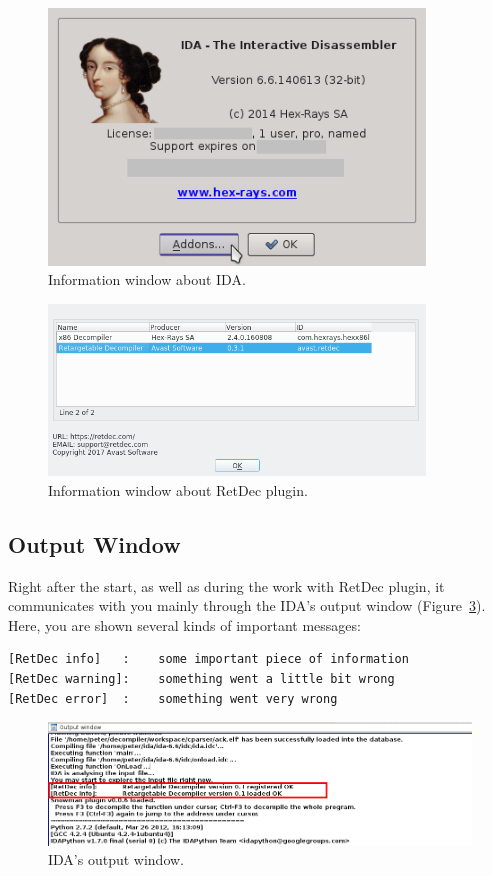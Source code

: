 \documentclass[pdftex, a4paper,12pt, oneside, svgnames]{article}
\begin{document}
\begin{figure}[!ht]
	\centering
	\includegraphics[width=10cm]{figures/addons}
	\caption{Information window about IDA.}
	\label{fig:addons}
\end{figure}

\begin{figure}[!ht]
	\centering
	\includegraphics[width=10cm]{figures/plugin-info}
	\caption{Information window about RetDec plugin.}
	\label{fig:plugin-info}
\end{figure}

\subsection{Output Window}
Right after the start, as well as during the work with RetDec plugin, it communicates with you mainly through the IDA's output window (Figure~\ref{fig:ida-output-window}). Here, you are shown several kinds of important messages:
\begin{verbatim}
[RetDec info]   :    some important piece of information
[RetDec warning]:    something went a little bit wrong
[RetDec error]  :    something went very wrong
\end{verbatim}

\begin{figure}[!ht]
	\centering
	\includegraphics[width=13cm]{figures/ida-output-window-highlighted}
	\caption{IDA's output window.}
	\label{fig:ida-output-window}
\end{figure}
\end{document}
